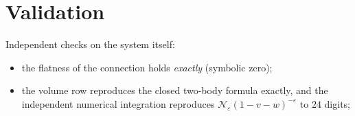 \documentclass[11pt]{article}
\newcommand{\eps}{\varepsilon}
\begin{document}
\section{Validation}
\label{sec:validation}

Independent checks on the system itself:
\begin{itemize}
\item the flatness of the connection holds \emph{exactly}
  (symbolic zero);
\item the volume row reproduces the closed two-body formula exactly,
  and the independent numerical integration reproduces
  $\mathcal{N}_\eps (1-v-w)^{-\eps}$ to $24$ digits;
\end{itemize}
\end{document}
